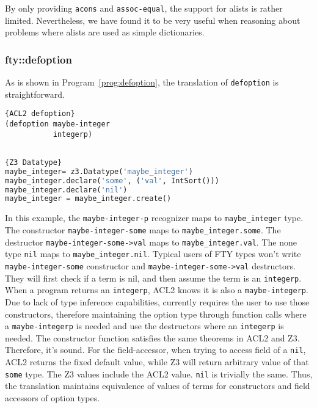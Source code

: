 By only providing \texttt{acons} and \texttt{assoc-equal}, the \smtlink{}
support for alists is rather limited.  Nevertheless, we have found it to be very
useful when reasoning about problems where alists are used as simple
dictionaries. 

\subsubsection{fty::defoption}
As is shown in Program~\ref{prog:defoption}, the translation of
\texttt{defoption} is straightforward.

\noindent\begin{minipage}{.35\textwidth}\label{prog:defoption}
\begin{lstlisting}[caption=ACL2 deflist,frame=tlrb,style=snippet,language=LISP]{ACL2 defoption}
(defoption maybe-integer
           integerp)


\end{lstlisting}
\end{minipage}\hfill
\begin{minipage}{.61\textwidth}
\begin{lstlisting}[caption=Z3 Datatype,frame=tlrb,style=snippet,language=Python]{Z3 Datatype}
maybe_integer= z3.Datatype('maybe_integer')
maybe_integer.declare('some', ('val', IntSort()))
maybe_integer.declare('nil')
maybe_integer = maybe_integer.create()
\end{lstlisting}
\end{minipage}

In this example, the \texttt{maybe-integer-p} recognizer maps to
\texttt{maybe_integer} type. The constructor \texttt{maybe-integer-some} maps to
\texttt{maybe_integer.some}. The destructor \texttt{maybe-integer-some->val} 
maps to \texttt{maybe_integer.val}. The none type \texttt{nil} maps to
\texttt{maybe_integer.nil}. Typical users of FTY types won't write
\texttt{maybe-integer-some} constructor and \texttt{maybe-integer-some->val}
destructors. They will first check if a term is nil, and then assume the term is
an \texttt{integerp}. When a program returns an \texttt{integerp}, ACL2 knows it
is also a \texttt{maybe-integerp}. Due to lack of type inference capabilities,
\smtlink{} currently requires the user to use those constructors, therefore
maintaining the option type through function calls where a
\texttt{maybe-integerp} is needed and use the destructors where an
\texttt{integerp} is needed.  The constructor function satisfies the same theorems
in ACL2 and Z3.  Therefore, it's sound.  For the field-accessor, when trying to
access field of a \texttt{nil}, ACL2 returns the fixed default value, while Z3
will return arbitrary value of that \texttt{some} type. The Z3 values include
the ACL2 value.  \texttt{nil} is trivially the same. Thus, the \smtlink{}
translation maintains equivalence of values of terms for constructors and field
accessors of option types.

